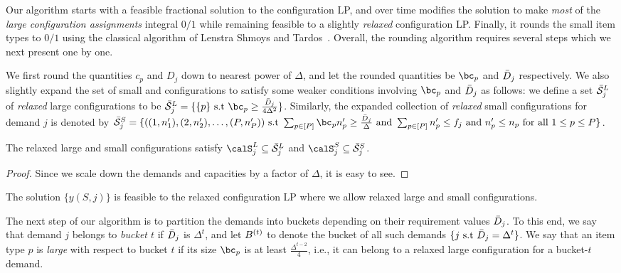 Our algorithm starts with a feasible fractional solution to the configuration LP, and over time modifies the solution to make \emph{most} of the \emph{large configuration assignments} integral $0/1$ while remaining feasible to a slightly \emph{relaxed} configuration LP. Finally, it rounds the small item types to $0/1$ using the classical algorithm of Lenstra Shmoys and Tardos~\cite{LST}. Overall, the rounding algorithm requires several steps which we next present one by one.

\medskip {}
We first round the quantities $c_p$ and $D_j$ down to nearest power of $\Delta$, and let the rounded quantities be $\bc_p$ and ${\bar D}_j$ respectively.
We also slightly expand the set of small and configurations to satisfy some weaker conditions involving $\bc_p$ and ${\bar D}_j$ as follows: we define a set $\bar{\cal S}^L_j$ of \emph{relaxed} large configurations to be $\barcalS^L_j = \{ \{p\} \text{ s.t } \bc_p \geq \frac{\barD_j}{4 \Delta^2}  \}$. Similarly, the expanded collection of \emph{relaxed} small configurations for demand $j$ is denoted by $\barcalS^S_j = \{ ((1,n'_1), (2,n'_2), \ldots, (P,n'_P)) \text{ s.t } \sum_{p \in [P]} \bc_p n'_p \geq \frac{\barD_j}{\Delta} \text{ and } \sum_{p \in [P]} n'_p \leq f_j \text{ and } n'_p \leq n_p \text{ for all } 1 \leq p \leq P \}$.

\begin{claim}
The relaxed large and small configurations satisfy $\calS^L_j \subseteq \barcalS^L_j$ and $\calS^S_j \subseteq \barcalS^S_j$.
\end{claim}

\begin{proof}
Since we scale down the demands and capacities by a factor of $\Delta$, it is easy to see.
\end{proof}

\begin{corollary}
The solution $\{y(S,j)\}$ is feasible to the relaxed configuration LP where we allow relaxed large and small configurations.
\end{corollary}


\medskip {}
The next step of our algorithm is to partition the demands into buckets depending on their requirement values ${\bar D}_j$. To this end, we say that demand $j$ belongs to \emph{bucket $t$} if
${\bar D}_j$ is $\Delta^t$, and let $B^{(t)}$ to denote the bucket of all such demands $\{j \text{ s.t } {\bar D}_j = \Delta^t\}$. We say that an item type $p$ is \emph{large} with respect to bucket $t$ if its size $\bc_p$ is at least $\frac{\Delta^{t-2}}{4}$, i.e., it can belong to a relaxed large configuration for a bucket-$t$ demand.  %

